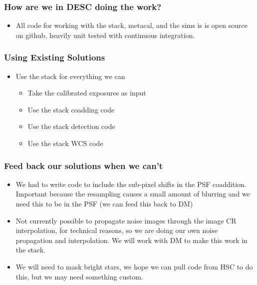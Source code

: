 \documentclass{beamer}
\begin{document}
\frame
{

    \frametitle{How are we in DESC doing the work?}

    \begin{itemize}

        \item All code for working with the stack, metacal, and the sims is is
            open source on github, heavily unit tested with continuous
            integration.

    \end{itemize}

}


\frame
{

    \frametitle{Using Existing Solutions}

    \begin{itemize}

                \item Use the stack for everything we can
                    \begin{itemize}
                        \item Take the calibrated exposures as input
                        \item Use the stack coadding code
                        \item Use the stack detection code
                        \item Use the stack WCS code
                    \end{itemize}

    \end{itemize}

}
\frame
{

    \frametitle{Feed back our solutions when we can't}


    \begin{itemize}


                \item We had to write code to include the sub-pixel shifts in
                    the PSF coaddition.  Important because the resampling
                    causes a small amount of blurring and we need this to be in
                    the PSF (we can feed this back to DM)

                \item Not currently possible to propagate noise images through the image
                  CR interpolation, for technical reasons, so we are doing our own noise
                  propagation and interpolation.  We will work with DM to make
                  this work in the stack.

                \item We will need to mask bright stars, we hope we can pull code
                    from HSC to do this, but we may need something custom.



    \end{itemize}

}
\end{document}
